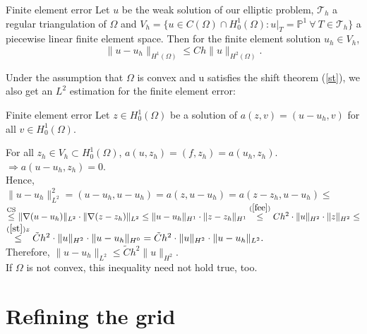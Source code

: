 \documentclass{beamer}
\begin{document}
\begin{frame}{Finite element error}
Let $u$ be the weak solution of our elliptic problem, $\mathcal{T}_h$ a regular triangulation of $\Omega$ and $V_h = \{u \in C(\Omega) \cap H_0^1(\Omega): u|_T = \mathbb{P}^1 \ \forall\ T \in \mathcal{T}_h \}$ a piecewise linear finite element space.
Then for the finite element solution $u_h \in V_h$,
\begin{equation}
	\|u - u_h\|_{H^1(\Omega)} \leq C h \|u\|_{H^2(\Omega)}. \label{fee}
\end{equation}	
	
Under the assumption that $\Omega$ is convex and u satisfies the shift theorem (\ref{st}), we also get an $L^2$ estimation for the finite element error:\\[1ex]

\end{frame}



\begin{frame}{Finite element error}
Let $z \in H_0^1(\Omega)$ be a solution of $a(z,v) = (u-u_h,v)$ for all  $v \in H_0^1(\Omega)$.

For all $z_h \in V_h \subset H_0^1(\Omega)$, $a(u,z_h) = (f,z_h) = a(u_h,z_h)$. $\Rightarrow a(u-u_h,z_h) = 0$.\\

\medskip
Hence, $\|u-u_h\|_{L^2}^2 = (u-u_h,u-u_h) = a(z,u-u_h) = a(z-z_h,u-u_h) \leq$\\
$\overset{\text{CS}}{\leq} \|\nabla(u-u_h)\|_{L^2} \cdot \|\nabla(z-z_h)\|_{L^2} \leq \|u-u_h\|_{H^1}  \cdot \|z-z_h\|_{H^1} \overset{(\ref{fee})}{\leq} Ch^2 \cdot \|u\|_{H^2} \cdot \|z\|_{H^2} \leq$\\
$\overset{(\ref{st}) z}{\leq} \tilde{C}h^2\cdot \|u\|_{H^2} \cdot \|u-u_h\|_{H^0} = \tilde{C}h^2\cdot \|u\|_{H^2}\cdot \|u-u_h\|_{L^2}.$\\

\medskip
Therefore, $\|u-u_h\|_{L^2} \leq \tilde{C}h^2 \|u\|_{H^2}$.\\[2.5ex]

If $\Omega$ is not convex, this inequality need not hold true, too.\\[0.9cm]


\end{frame}

\section{Refining the grid}
\end{document}
